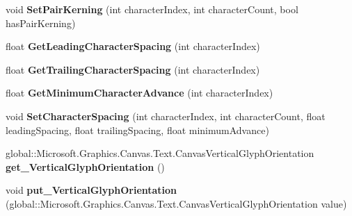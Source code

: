 \begin{DoxyCompactItemize}
void {\bfseries Set\+Pair\+Kerning} (int character\+Index, int character\+Count, bool has\+Pair\+Kerning)
\item 
\mbox{\label{class_microsoft_1_1_graphics_1_1_canvas_1_1_text_1_1_canvas_text_layout_a65d05d925378e8e2514390271630066c}} 
float {\bfseries Get\+Leading\+Character\+Spacing} (int character\+Index)
\item 
\mbox{\label{class_microsoft_1_1_graphics_1_1_canvas_1_1_text_1_1_canvas_text_layout_a70acd1bd088fdd6ab75e719f500f7d5c}} 
float {\bfseries Get\+Trailing\+Character\+Spacing} (int character\+Index)
\item 
\mbox{\label{class_microsoft_1_1_graphics_1_1_canvas_1_1_text_1_1_canvas_text_layout_ae70042fca13d7c261dea65b89cbbae5d}} 
float {\bfseries Get\+Minimum\+Character\+Advance} (int character\+Index)
\item 
\mbox{\label{class_microsoft_1_1_graphics_1_1_canvas_1_1_text_1_1_canvas_text_layout_a738825e42cca183687361df02597990c}} 
void {\bfseries Set\+Character\+Spacing} (int character\+Index, int character\+Count, float leading\+Spacing, float trailing\+Spacing, float minimum\+Advance)
\item 
\mbox{\label{class_microsoft_1_1_graphics_1_1_canvas_1_1_text_1_1_canvas_text_layout_afd275d5017f0ed4abf5747b6611ba137}} 
global\+::\+Microsoft.\+Graphics.\+Canvas.\+Text.\+Canvas\+Vertical\+Glyph\+Orientation {\bfseries get\+\_\+\+Vertical\+Glyph\+Orientation} ()
\item 
\mbox{\label{class_microsoft_1_1_graphics_1_1_canvas_1_1_text_1_1_canvas_text_layout_a45f5e962fa229c96404257c75c6a3a3c}} 
void {\bfseries put\+\_\+\+Vertical\+Glyph\+Orientation} (global\+::\+Microsoft.\+Graphics.\+Canvas.\+Text.\+Canvas\+Vertical\+Glyph\+Orientation value)
\item 
\mbox{\label{class_microsoft_1_1_graphics_1_1_canvas_1_1_text_1_1_canvas_text_layout_a9de04b11cf865c89c4a76010e49b21ac}} 

\end{DoxyCompactItemize}
